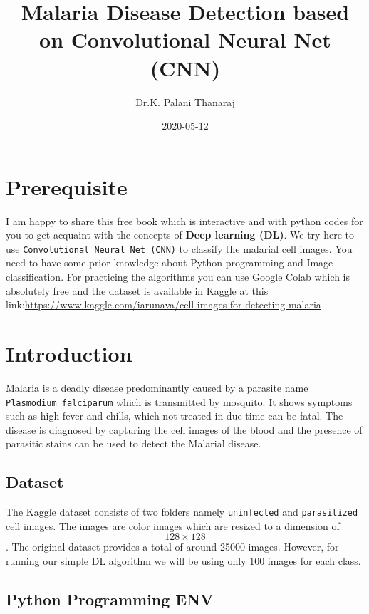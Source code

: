\documentclass[]{book}
\title{Malaria Disease Detection based on Convolutional Neural Net (CNN)}
\author{Dr.K. Palani Thanaraj}
\date{2020-05-12}
\begin{document}
\maketitle

{
\setcounter{tocdepth}{1}
\tableofcontents
}
\hypertarget{prerequisite}{%
\chapter*{Prerequisite}\label{prerequisite}}

I am happy to share this free book which is interactive and with python codes for you to get acquaint with the concepts of \textbf{Deep learning (DL)}. We try here to use \texttt{Convolutional\ Neural\ Net\ (CNN)} to classify the malarial cell images. You need to have some prior knowledge about Python programming and Image classification. For practicing the algorithms you can use Google Colab which is absolutely free and the dataset is available in Kaggle at this link:\url{https://www.kaggle.com/iarunava/cell-images-for-detecting-malaria}

\hypertarget{introduction}{%
\chapter{Introduction}\label{introduction}}

Malaria is a deadly disease predominantly caused by a parasite name \texttt{Plasmodium\ falciparum} which is transmitted by mosquito. It shows symptoms such as high fever and chills, which not treated in due time can be fatal. The disease is diagnosed by capturing the cell images of the blood and the presence of parasitic stains can be used to detect the Malarial disease.

\hypertarget{dataset}{%
\section{Dataset}\label{dataset}}

The Kaggle dataset consists of two folders namely \texttt{uninfected} and \texttt{parasitized} cell images. The images are color images which are resized to a dimension of \[128 \times 128\]. The original dataset provides a total of around 25000 images. However, for running our simple DL algorithm we will be using only 100 images for each class.

\hypertarget{python-programming-env}{%
\section{Python Programming ENV}\label{python-programming-env}}
\end{document}
